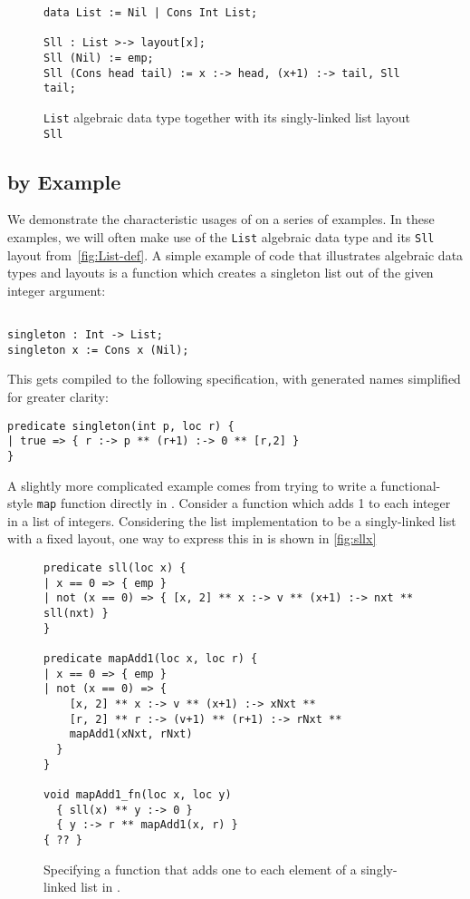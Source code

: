 \begin{figure}[t]
\begin{lstlisting}[language=Pika]
data List := Nil | Cons Int List;

Sll : List >-> layout[x];
Sll (Nil) := emp;
Sll (Cons head tail) := x :-> head, (x+1) :-> tail, Sll tail;
\end{lstlisting}
  \caption{\lstinline{List} algebraic data type together with its singly-linked list layout \lstinline{Sll}}
  \label{fig:List-def}
\end{figure}

\subsection{\Pika{} by Example}

We demonstrate the characteristic usages of \Pika{} on a series of
examples.
%
In these examples, we will often make use of the \verb|List| algebraic
data type and its \verb|Sll| layout from~\autoref{fig:List-def}. A
simple example of \Pika{} code that illustrates algebraic data types and
layouts is a function which creates a singleton list out of the given
integer argument:

\begin{lstlisting}[language=Pika]
%generate singleton [Int] Sll

singleton : Int -> List;
singleton x := Cons x (Nil);
\end{lstlisting}

\noindent
This gets compiled to the following \SuSLik{} specification, with generated names simplified for greater clarity:

\begin{lstlisting}[language=SynLang]
predicate singleton(int p, loc r) {
| true => { r :-> p ** (r+1) :-> 0 ** [r,2] }
}
\end{lstlisting}

\noindent
A slightly more complicated example comes from trying to write a
functional-style \verb|map| function directly in \SuSLik. Consider a
function which adds 1 to each integer in a list of integers.
Considering the list implementation to be a singly-linked list with a
fixed layout, one way to express this in \SuSLik{} is shown in \autoref{fig:sllx}

\begin{figure}[t]
  \begin{lstlisting}[language=SynLang]
predicate sll(loc x) {
| x == 0 => { emp }
| not (x == 0) => { [x, 2] ** x :-> v ** (x+1) :-> nxt ** sll(nxt) }
}

predicate mapAdd1(loc x, loc r) {
| x == 0 => { emp }
| not (x == 0) => {
    [x, 2] ** x :-> v ** (x+1) :-> xNxt **
    [r, 2] ** r :-> (v+1) ** (r+1) :-> rNxt **
    mapAdd1(xNxt, rNxt)
  }
}

void mapAdd1_fn(loc x, loc y)
  { sll(x) ** y :-> 0 }
  { y :-> r ** mapAdd1(x, r) }
{ ?? }
\end{lstlisting}
\caption{Specifying a function that adds one to each element of a
  singly-linked list in \SuSLik.}
\label{fig:sllx}
\end{figure}

